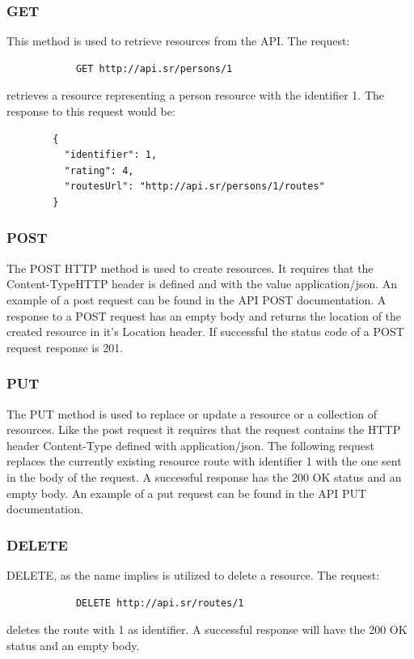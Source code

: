         \subsubsection*{GET}
        This method is used to retrieve resources from the API. The request: 
        \begin{verbatim}
            GET http://api.sr/persons/1 
        \end{verbatim}
        \vspace{-\baselineskip}
        retrieves a resource representing a person resource with the identifier 1. 
        The response to this request would be:
        \begin{lstlisting}
        {
          "identifier": 1,
          "rating": 4,
          "routesUrl": "http://api.sr/persons/1/routes"
        }
        \end{lstlisting}

        \subsubsection*{POST}
        The POST HTTP method is used to create resources. It requires that the Content-Type\cite{contenttype}HTTP header is 
        defined and with the value application/json\cite{applicationjson}. An example of a post request can be found in the 
        API POST\cite{apipostdocs} documentation. A response to a POST request has an empty body and returns the 
        location of the created resource in it's Location header. If successful the status code of a POST request response is 201.  
            
        \subsubsection*{PUT}
        The PUT method is used to replace or update a resource or a collection of resources. Like the post request it requires 
        that the request contains the HTTP header Content-Type defined with application/json.
        The following request replaces the currently existing resource route with identifier 1 with the one sent in 
        the body of the request. A successful response has the 200 OK status and an empty body. An example of a put 
        request can be found in the API PUT\cite{apiputdocs} documentation.

        \subsubsection*{DELETE}
        DELETE, as the name implies is utilized to delete a resource. The request: 
        \begin{verbatim}
            DELETE http://api.sr/routes/1
        \end{verbatim}
        \vspace{-\baselineskip}
        deletes the route with 1 as identifier. A successful response will have the 200 OK status and an empty body.
    
